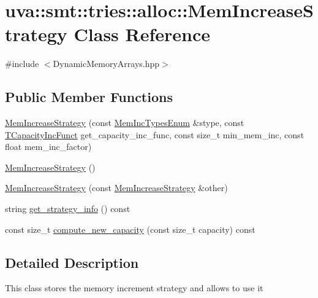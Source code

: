 \hypertarget{classuva_1_1smt_1_1tries_1_1alloc_1_1_mem_increase_strategy}{}\section{uva\+:\+:smt\+:\+:tries\+:\+:alloc\+:\+:Mem\+Increase\+Strategy Class Reference}
\label{classuva_1_1smt_1_1tries_1_1alloc_1_1_mem_increase_strategy}


{\ttfamily \#include $<$Dynamic\+Memory\+Arrays.\+hpp$>$}

\subsection*{Public Member Functions}
\begin{DoxyCompactItemize}
\item 
\hyperlink{classuva_1_1smt_1_1tries_1_1alloc_1_1_mem_increase_strategy_a586918b5019f9bc8d151929593c51280}{Mem\+Increase\+Strategy} (const \hyperlink{namespaceuva_1_1smt_1_1tries_1_1alloc_aa19a45a19458f601785f08cb24e17f16}{Mem\+Inc\+Types\+Enum} \&stype, const \hyperlink{namespaceuva_1_1smt_1_1tries_1_1alloc_a3e6a48b58d6f09d775e523709e041d3c}{T\+Capacity\+Inc\+Funct} get\+\_\+capacity\+\_\+inc\+\_\+func, const size\+\_\+t min\+\_\+mem\+\_\+inc, const float mem\+\_\+inc\+\_\+factor)
\item 
\hyperlink{classuva_1_1smt_1_1tries_1_1alloc_1_1_mem_increase_strategy_aad052afc385e8d24d66937c1aa89bd96}{Mem\+Increase\+Strategy} ()
\item 
\hyperlink{classuva_1_1smt_1_1tries_1_1alloc_1_1_mem_increase_strategy_a1366401f3007e09cde61457e51e8b615}{Mem\+Increase\+Strategy} (const \hyperlink{classuva_1_1smt_1_1tries_1_1alloc_1_1_mem_increase_strategy}{Mem\+Increase\+Strategy} \&other)
\item 
string \hyperlink{classuva_1_1smt_1_1tries_1_1alloc_1_1_mem_increase_strategy_a89e1eccab1dd9d20e2406c614800eb0c}{get\+\_\+strategy\+\_\+info} () const 
\item 
const size\+\_\+t \hyperlink{classuva_1_1smt_1_1tries_1_1alloc_1_1_mem_increase_strategy_a0044f06974e9bd072e04df1d34b5f5cd}{compute\+\_\+new\+\_\+capacity} (const size\+\_\+t capacity) const 
\end{DoxyCompactItemize}


\subsection{Detailed Description}
This class stores the memory increment strategy and allows to use it 

